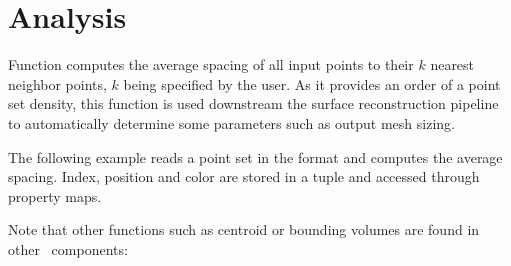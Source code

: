 \section{Analysis}

Function  computes the average spacing of all input points to their $k$ nearest neighbor points, $k$ being specified by the user. As it provides an order of a point set density, this function is used downstream the surface reconstruction pipeline to automatically determine some parameters such as output mesh sizing. \\

\ccExample

The following example reads a point set in the  format and computes the average spacing. Index, position and color are stored in a tuple and accessed through property maps.

Note that other functions such as centroid or bounding volumes are found in other \cgal\ components: \\
  \\
  \\
  \\

